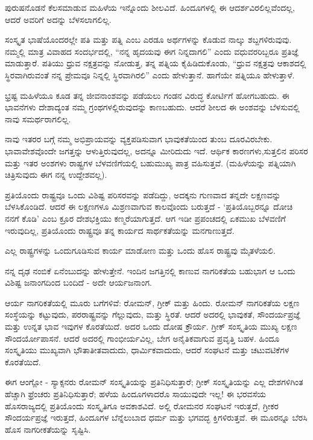 ಪುರುಷನೊಡನೆ ಕೆಲಸಮಾಡುವ ಮಹಿಳೆಯ ಇನ್ನೊಂದು ಶೀಲವಿದೆ. ಹಿಂದೂಗಳಲ್ಲಿ ಈ ಆದರ್ಶವಿರಲಿಲ್ಲವೆಂದಲ್ಲ, ಆದರೆ ಅವರಿಗೆ ಅದನ್ನು ಬೆಳಸಲಾಗಲಿಲ್ಲ.

ಸಂಸ್ಕೃತ ಭಾಷೆಯೊಂದರಲ್ಲೇ ಪತಿ ಮತ್ತು ಪತ್ನಿ ಎಂಬ ಎರಡೂ ಅರ್ಥಗಳನ್ನು ಕೊಡುವ ನಾಲ್ಕು ಶಬ್ದಗಳಿರುವುವು. ನಮ್ಮಲ್ಲಿ ಮಾತ್ರ ವಿವಾಹದ ಸಂದರ್ಭದಲ್ಲಿ, “ನನ್ನ ಹೃದಯವು ಈಗ ನಿನ್ನದಾಗಲಿ” ಎಂದು ವಧುವರರಿಬ್ಬರೂ ಪ್ರತಿಜ್ಞೆ ಮಾಡುತ್ತಾರೆ. ಪತಿಯು ಧ್ರುವ ನಕ್ಷತ್ರವನ್ನು ನೋಡುತ್ತ, ತನ್ನ ಪತ್ನಿಯ ಕೈಹಿಡಿದುಕೊಂಡು, “ಧ್ರುವ ನಕ್ಷತ್ರವು ಆಕಾಶದಲ್ಲಿ ಸ್ಥಿರವಾಗಿರುವಂತೆ ನನ್ನ ಪ್ರೇಮವೂ ನಿನ್ನಲ್ಲಿ ಸ್ಥಿರವಾಗಿರಲಿ” ಎಂದು ಹೇಳುತ್ತಾನೆ. ಹಾಗೆಯೇ ಪತ್ನಿಯೂ ಹೇಳುತ್ತಾಳೆ.

ಭ್ರಷ್ಟ ಮಹಿಳೆಯೂ ಕೂಡ ತನ್ನ ಜೀವನಾಂಶವನ್ನು ಪಡೆಯಲು ಗಂಡನ ವಿರುದ್ಧ ಕೋರ್ಟಿಗೆ ಹೋಗಬಹುದು. ಈ ಭಾವನೆಗಳು ದೇಶಾದ್ಯಂತ ನಮ್ಮ ಗ್ರಂಥಗಳಲ್ಲಿರುವುದನ್ನು ಕಾಣಬಹುದು. ಆದರೆ ಶೀಲದ ಈ ಅಂಶವನ್ನು ಬೆಳಸುವಲ್ಲಿ ನಾವು ಸಮರ್ಥರಾಗಲಿಲ್ಲ.

ನಾವು ಇತರರ ಬಗ್ಗೆ ನಮ್ಮ ಅಭಿಪ್ರಾಯವನ್ನು ವ್ಯಕ್ತಪಡಿಸುವಾಗ ಭಾವುಕತೆಯಿಂದ ತುಂಬ ದೂರವಿರಬೇಕು. ಭಾವಾವೇಶವೊಂದೇ ಜಗತ್ತನ್ನು ಆಳುತ್ತಿರುವುದಲ್ಲ, ಅದನ್ನೂ ಮೀರಿದುದು ಇದೆ. ಆರ್ಥಿಕ ಕಾರಣಗಳು,ಸುತ್ತಲಿನ ಪರಿಸರ ಮತ್ತು ಇತರ ಅಂಶಗಳು ರಾಷ್ಟ್ರಗಳ ಬೆಳವಣಿಗೆಯಲ್ಲಿ ಬಹುಮುಖ್ಯ ಪಾತ್ರ ವಹಿಸುತ್ತವೆ. (ಮಹಿಳೆಯನ್ನು ಪತ್ನಿಯಾಗಿ ಚಿತ್ರಿಸುವುದು ಈಗ ನನ್ನ ಉದ್ದೇಶವಲ್ಲ).

ಪ್ರತಿಯೊಂದು ರಾಷ್ಟ್ರವೂ ಒಂದು ವಿಶಿಷ್ಟ ಪರಿಸರವನ್ನು ಪಡೆದಿದ್ದು, ಅದಕ್ಕನು ಗುಣವಾದ ತನ್ನದೇ ಲಕ್ಷಣವನ್ನು ಬೆಳಸಿಕೊಂಡಿದೆ. ಆದರೆ ಈ ಲಕ್ಷಣಗಳೂ ಮಿಶ್ರಣವಾಗುವ ಕಾಲವೊಂದು ಬರುತ್ತದೆ - ‘ಪ್ರತಿಯೊಬ್ಬರನ್ನೂ ದೋಚಿ ನನಗೆ ಕೊಡಿ’ ಎಂಬ ಕ್ರೂರ ದೇಶಭಕ್ತಿಯು ಕಣ್ಮರೆಯಾಗುತ್ತದೆ. ಆಗ ಇಡೀ ಪ್ರಪಂಚದಲ್ಲಿ ಏಕಮುಖ ಬೆಳವಣಿಗೆ ಇರುವುದಿಲ್ಲ, ಪ್ರತಿಯೊಂದು ರಾಷ್ಟ್ರವೂ ತನ್ನ ಕಾರ್ಯದ ಸಾರ್ಥಕತೆಯನ್ನು ಮನಗಾಣುತ್ತದೆ.

ಎಲ್ಲ ರಾಷ್ಟ್ರಗಳನ್ನು ಒಂದುಗೂಡಿಸುವ ಕಾರ್ಯ ಮಾಡೋಣ ಮತ್ತು ಒಂದು ಹೊಸ ರಾಷ್ಟ್ರವು ಮೈತಳೆಯಲಿ.

ನನ್ನ ದೃಢ ನಂಬಿಕೆ ಏನೆಂಬುದನ್ನು ಹೇಳುತ್ತೇನೆ. ಇಂದಿನ ಜಗತ್ತಿನಲ್ಲಿ ಕಾಣುವ ನಾಗರಿಕತೆಯ ಬಹುಭಾಗ ಆ ಒಂದು ವಿಶಿಷ್ಟ ಜನಾಂಗದಿಂದ ಬಂದಿದೆ - ಅದೇ ಆರ್ಯಜನಾಂಗ.

ಆರ್ಯ ನಾಗರಿಕತೆಯಲ್ಲಿ ಮೂರು ಬಗೆಗಳಿವೆ: ರೋಮನ್, ಗ್ರೀಕ್ ಮತ್ತು ಹಿಂದು. ರೋಮನ್ ನಾಗರಿಕತೆಯ ಲಕ್ಷಣ ಸಂಸ್ಥೆಯನ್ನು ಕಟ್ಟುವುದು, ಪರರಾಷ್ಟ್ರವನ್ನು ಗೆಲ್ಲುವುದು, ಮತ್ತು ಸ್ಥಿರತೆ. ಆದರೆ ಅದರಲ್ಲಿ ಭಾವುಕತೆ, ಸೌಂದರ್ಯಪ್ರಜ್ಞೆ ಮತ್ತು ಉನ್ನತ ಭಾವ ಇವುಗಳ ಕೊರತೆಯಿದೆ. ಅದರ ಒಂದು ದೋಷ ಕ್ರೌರ್ಯ. ಗ್ರೀಕ್ ಸಂಸ್ಕೃತಿಯ ಮುಖ್ಯ ಲಕ್ಷಣ ಸೌಂದರ್ಯೋಪಾಸನೆ. ಆದರೆ ಅದರಲ್ಲಿ ಗಾಂಭೀರ್ಯವಿಲ್ಲ, ಬೇಗ ಅನೈತಿಕವಾಗುವ ಪ್ರವೃತ್ತಿ ಬಹಳ. ಹಿಂದೂ ಸಂಸ್ಕೃತಿಯು ಮುಖ್ಯವಾಗಿ ಭೌತಾತೀತವಾದುದು, ಧಾರ್ಮಿಕವಾದುದು, ಆದರೆ ಸಂಘಟನೆ ಮತ್ತು ಚಟುವಟಿಕೆಗಳ ಕೊರತೆಯಿದೆ.

ಈಗ ಆಂಗ್ಲೋ - ಸ್ಯಾಕ್ಸನರು ರೋಮನ್ ಸಂಸ್ಕೃತಿಯನ್ನು ಪ್ರತಿನಿಧಿಸುತ್ತಾರೆ; ಗ್ರೀಕ್ ಸಂಸ್ಕೃತಿಯನ್ನು ಎಲ್ಲ ದೇಶಗಳಿಗಿಂತ ಹೆಚ್ಚಾಗಿ ಫ್ರೆಂಚರು ಪ್ರತಿನಿಧಿಸುತ್ತಾರೆ; ಹಳೆಯ ಹಿಂದೂಗಳಾದರೊ ಸಾಯುವುದೇ ಇಲ್ಲ! ಈ ಭರವಸೆಯ ಹೊಸರಾಜ್ಯದಲ್ಲಿ ಪ್ರತಿಯೊಂದು ಸಂಸ್ಕೃತಿಗೂ ಅವಕಾಶವಿದೆ. ಅಲ್ಲಿ ರೋಮನರ ಸಂಘಟನೆ ಇರುತ್ತದೆ, ಗ್ರೀಕರ ಸೌಂದರ್ಯಪ್ರಜ್ಞೆ ಇರುತ್ತದೆ, ಹಿಂದೂಗಳ ಬೆನ್ನೆಲುಬಾದ ಧರ್ಮ ಮತ್ತು ಭಗವದ್ಭ ಕ್ತಿಗಳಿರುತ್ತವೆ. ಈ ಮೂರನ್ನೂ ಬೆರಸಿ ಹೊಸ ನಾಗರೀಕತೆಯನ್ನು ಸೃಷ್ಟಿಸಿ.

